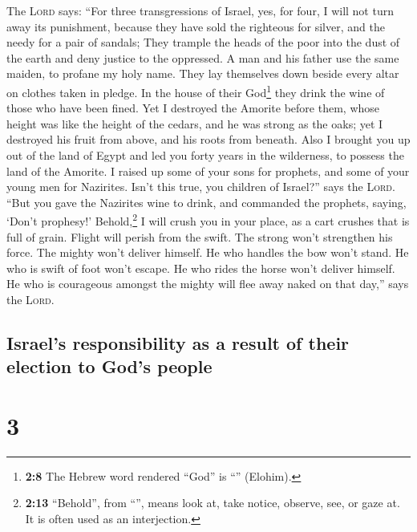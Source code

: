  The \textsc{Lord} says: ``For three transgressions of
Israel, yes, for four, I will not turn away its punishment, because they
have sold the righteous for silver, and the needy for a pair of sandals;
 They trample the heads of the poor into the dust of the
earth and deny justice to the oppressed. A man and his father use the
same maiden, to profane my holy name.  They lay themselves
down beside every altar on clothes taken in pledge. In the house of
their God\footnote{\textbf{2:8} The Hebrew word rendered ``God'' is
  ``'' (Elohim).} they drink the wine of those who have
been fined.  Yet I destroyed the Amorite before them,
whose height was like the height of the cedars, and he was strong as the
oaks; yet I destroyed his fruit from above, and his roots from beneath.
 Also I brought you up out of the land of Egypt and led
you forty years in the wilderness, to possess the land of the Amorite.
 I raised up some of your sons for prophets, and some of
your young men for Nazirites. Isn't this true, you children of Israel?''
says the \textsc{Lord}.  ``But you gave the Nazirites
wine to drink, and commanded the prophets, saying, `Don't prophesy!'
 Behold,\footnote{\textbf{2:13} ``Behold'', from
  ``'', means look at, take notice, observe, see, or gaze
  at. It is often used as an interjection.} I will crush you in your
place, as a cart crushes that is full of grain.  Flight
will perish from the swift. The strong won't strengthen his force. The
mighty won't deliver himself.  He who handles the bow
won't stand. He who is swift of foot won't escape. He who rides the
horse won't deliver himself.  He who is courageous
amongst the mighty will flee away naked on that day,'' says the
\textsc{Lord}.

\hypertarget{israels-responsibility-as-a-result-of-their-election-to-gods-people}{%
\subsection{Israel's responsibility as a result of their election to
God's
people}\label{israels-responsibility-as-a-result-of-their-election-to-gods-people}}

\hypertarget{section-2}{%
\section{3}\label{section-2}}

